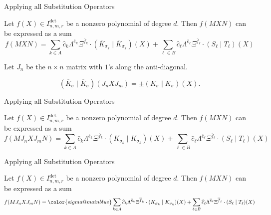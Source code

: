 \documentclass[aspectratio=169]{beamer}
\begin{document}
\begin{frame}{Applying all Substitution Operators}
    \begin{lem}[{\cite[Lemma 3.9]{DG25}}]
      Let $f(X) \in I^{\det}_{n, m, r}$ be a nonzero polynomial of degree $d$.
      Then $f(MXN)$ can be expressed as a sum
      \begin{equation*}
        f(MXN) = \sum_{k \in A} \widehat{c}_{k} \Lambda^{\overline{e}_k}\Xi^{\overline{f}_k}\cdot (\overline{K}_{\sigma_k}\mid \overline{K}_{\sigma_k})(X) + \sum_{\ell \in B} \widehat{c}_{\ell} \Lambda^{\overline{e}_\ell}\Xi^{\overline{f}_\ell}\cdot (S_\ell\mid T_\ell)(X)
      \end{equation*}
    \end{lem}

    \pause

    Let $J_n$ be the $n \times n$ matrix with $1$'s along the anti-diagonal.\ \pause
    \begin{lem}
        \[
            (\overline{K}_\sigma \mid \overline{K}_\sigma)(J_n X J_m) = \pm (K_\sigma \mid K_\sigma)(X).
        \]
    \end{lem}
\end{frame}

\begin{frame}{Applying all Substitution Operators}
    \begin{lem}[{\cite[Corollary 3.10]{DG25}}]
      Let $f(X) \in I^{\det}_{n, m, r}$ be a nonzero polynomial of degree $d$.
      Then $f(MXN)$ can be expressed as a sum
      \begin{equation*}
        f(M J_n X J_m N) = {\sum_{k \in A} \widehat{c}_{k} \Lambda^{\overline{e}_k}\Xi^{\overline{f}_k}\cdot (K_{\sigma_k}\mid K_{\sigma_k})(X)} + \sum_{\ell \in B} \widehat{c}_{\ell} \Lambda^{\overline{e}_\ell}\Xi^{\overline{f}_\ell}\cdot (S_\ell\mid T_\ell)(X)
      \end{equation*}
    \end{lem}
\end{frame}

\begin{frame}{Applying all Substitution Operators}
    \begin{lem}[{\cite[Corollary 3.10]{DG25}}]
      Let $f(X) \in I^{\det}_{n, m, r}$ be a nonzero polynomial of degree $d$.
      Then $f(MXN)$ can be expressed as a sum
      \begin{equation*}
        f(M J_n X J_m N) = {\color{sigma@mainblue}\sum_{k \in A} \widehat{c}_{k} \Lambda^{\overline{e}_k}\Xi^{\overline{f}_k}\cdot (K_{\sigma_k}\mid K_{\sigma_k})(X)} + \sum_{\ell \in B} \widehat{c}_{\ell} \Lambda^{\overline{e}_\ell}\Xi^{\overline{f}_\ell}\cdot (S_\ell\mid T_\ell)(X)
      \end{equation*}
    \end{lem}
\end{frame}
\end{document}
